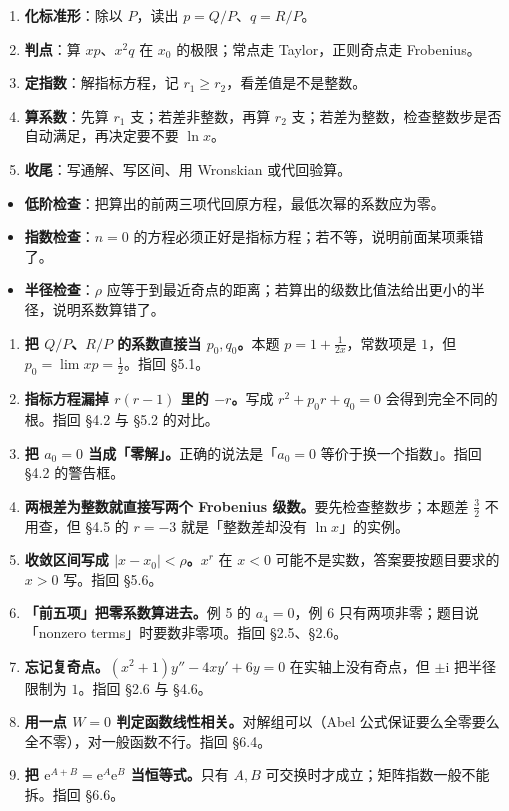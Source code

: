\documentclass[11pt]{ctexart}
\let\orighdr\hdr
\renewcommand{\hdr}[2]{\needspace{6\baselineskip}\orighdr{#1}{#2}}
\let\origsubhdr\subhdr
\renewcommand{\subhdr}[1]{\needspace{3\baselineskip}\origsubhdr{#1}}
\newcommand{\ii}{\mathrm{i}}
\newcommand{\ee}{\mathrm{e}}
\begin{document}

\begin{enumerate}
  \item \textbf{化标准形}：除以 $P$，读出 $p=Q/P$、$q=R/P$。
  \item \textbf{判点}：算 $xp$、$x^2q$ 在 $x_0$ 的极限；常点走 Taylor，正则奇点走 Frobenius。
  \item \textbf{定指数}：解指标方程，记 $r_1\geq r_2$，看差值是不是整数。
  \item \textbf{算系数}：先算 $r_1$ 支；若差非整数，再算 $r_2$ 支；若差为整数，检查整数步是否自动满足，再决定要不要 $\ln x$。
  \item \textbf{收尾}：写通解、写区间、用 Wronskian 或代回验算。
\end{enumerate}


\begin{itemize}
  \item \textbf{低阶检查}：把算出的前两三项代回原方程，最低次幂的系数应为零。
  \item \textbf{指数检查}：$n=0$ 的方程必须正好是指标方程；若不等，说明前面某项乘错了。
  \item \textbf{半径检查}：$\rho$ 应等于到最近奇点的距离；若算出的级数比值法给出更小的半径，说明系数算错了。
\end{itemize}


\begin{enumerate}[leftmargin=2.2em]
  \item \textbf{把 $Q/P$、$R/P$ 的系数直接当 $p_0,q_0$。}本题 $p=1+\frac{1}{2x}$，常数项是 $1$，但 $p_0=\lim xp=\frac12$。指回 §5.1。
  \item \textbf{指标方程漏掉 $r(r-1)$ 里的 $-r$。}写成 $r^2+p_0r+q_0=0$ 会得到完全不同的根。指回 §4.2 与 §5.2 的对比。
  \item \textbf{把 $a_0=0$ 当成「零解」。}正确的说法是「$a_0=0$ 等价于换一个指数」。指回 §4.2 的警告框。
  \item \textbf{两根差为整数就直接写两个 Frobenius 级数。}要先检查整数步；本题差 $\frac32$ 不用查，但 §4.5 的 $r=-3$ 就是「整数差却没有 $\ln x$」的实例。
  \item \textbf{收敛区间写成 $|x-x_0|<\rho$。}$x^r$ 在 $x<0$ 可能不是实数，答案要按题目要求的 $x>0$ 写。指回 §5.6。
  \item \textbf{「前五项」把零系数算进去。}例 5 的 $a_4=0$，例 6 只有两项非零；题目说「nonzero terms」时要数非零项。指回 §2.5、§2.6。
  \item \textbf{忘记复奇点。}$(x^2+1)y''-4xy'+6y=0$ 在实轴上没有奇点，但 $\pm\ii$ 把半径限制为 $1$。指回 §2.6 与 §4.6。
  \item \textbf{用一点 $W=0$ 判定函数线性相关。}对解组可以（Abel 公式保证要么全零要么全不零），对一般函数不行。指回 §6.4。
  \item \textbf{把 $\ee^{A+B}=\ee^A\ee^B$ 当恒等式。}只有 $A,B$ 可交换时才成立；矩阵指数一般不能拆。指回 §6.6。
\end{enumerate}
\end{document}
